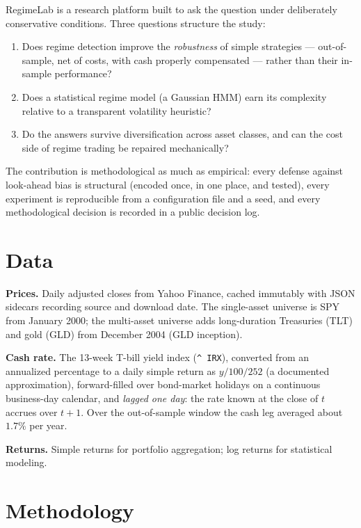 \documentclass[11pt]{article}
\newcommand{\code}[1]{\texttt{#1}}
\begin{document}
RegimeLab is a research platform built to ask the question under deliberately
conservative conditions. Three questions structure the study:

\begin{enumerate}
  \item Does regime detection improve the \emph{robustness} of simple
        strategies --- out-of-sample, net of costs, with cash properly
        compensated --- rather than their in-sample performance?
  \item Does a statistical regime model (a Gaussian HMM) earn its complexity
        relative to a transparent volatility heuristic?
  \item Do the answers survive diversification across asset classes, and can
        the cost side of regime trading be repaired mechanically?
\end{enumerate}

The contribution is methodological as much as empirical: every defense
against look-ahead bias is structural (encoded once, in one place, and
tested), every experiment is reproducible from a configuration file and a
seed, and every methodological decision is recorded in a public decision log.

\section{Data}

\textbf{Prices.} Daily adjusted closes from Yahoo Finance, cached immutably
with JSON sidecars recording source and download date. The single-asset
universe is SPY from January 2000; the multi-asset universe adds long-duration
Treasuries (TLT) and gold (GLD) from December 2004 (GLD inception).

\textbf{Cash rate.} The 13-week T-bill yield index (\code{\textasciicircum
IRX}), converted from an annualized percentage to a daily simple return as
$y/100/252$ (a documented approximation), forward-filled over bond-market
holidays on a continuous business-day calendar, and \emph{lagged one day}: the
rate known at the close of $t$ accrues over $t{+}1$. Over the out-of-sample
window the cash leg averaged about $1.7\%$ per year.

\textbf{Returns.} Simple returns for portfolio aggregation; log returns for
statistical modeling.

\section{Methodology}
\end{document}
